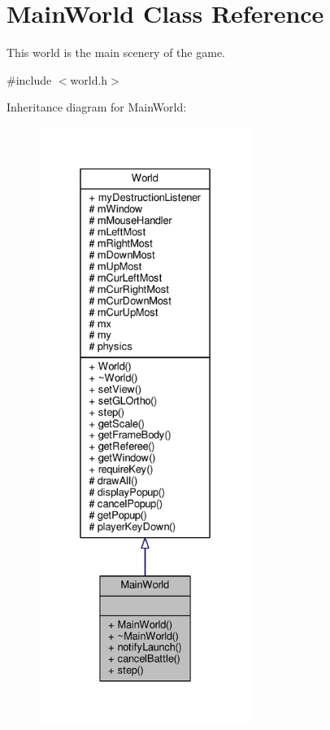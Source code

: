 \hypertarget{classMainWorld}{}\section{Main\+World Class Reference}
\label{classMainWorld}


This world is the main scenery of the game.  




{\ttfamily \#include $<$world.\+h$>$}



Inheritance diagram for Main\+World\+:\nopagebreak
\begin{figure}[H]
\begin{center}
\leavevmode
\includegraphics[height=550pt]{classMainWorld__inherit__graph}
\end{center}
\end{figure}



